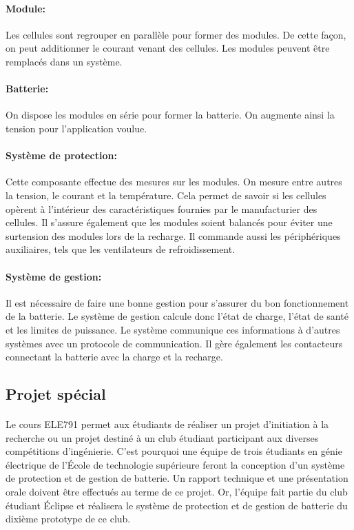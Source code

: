 		\paragraph{Module:}
		 Les cellules sont regrouper en parallèle pour former des modules. De cette façon, on peut additionner le courant venant des cellules. Les modules peuvent être remplacés dans un système.
		
		\paragraph{Batterie:}
		 On dispose les modules en série pour former la batterie. On augmente ainsi la tension pour l'application voulue.
		
		\paragraph{Système de protection:}
		 Cette composante effectue des mesures sur les modules. On mesure entre autres la tension, le courant et la température. Cela permet de savoir si les cellules opèrent à l'intérieur des caractéristiques fournies par le manufacturier des cellules. Il s'assure également que les modules soient balancés pour éviter une surtension des modules lors de la recharge. Il commande aussi les périphériques auxiliaires, tels que les ventilateurs de refroidissement.
		
		\paragraph{Système de gestion:}
		 Il est nécessaire de faire une bonne gestion pour s'assurer du bon fonctionnement de la batterie. Le système de gestion calcule donc l'état de charge, l'état de santé et les limites de puissance. Le système communique ces informations à d'autres systèmes avec un protocole de communication. Il gère également les contacteurs connectant la batterie avec la charge et la recharge.
	
	\subsection{Projet spécial}

		\paragraph{}
		Le cours ELE791 permet aux étudiants de réaliser un projet d'initiation à la recherche ou un projet destiné à un club étudiant participant aux diverses compétitions d'ingénierie. C'est pourquoi une équipe de trois étudiants en génie électrique de l'École de technologie supérieure feront la conception d'un système de protection et de gestion de batterie. Un rapport technique et une présentation orale doivent être effectués au terme de ce projet. Or, l'équipe fait partie du club étudiant Éclipse et réalisera le système de protection et de gestion de batterie du dixième prototype de ce club.
	
